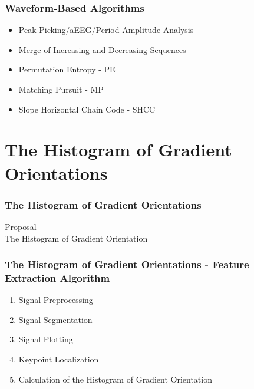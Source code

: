 \documentclass[aspectratio=169]{beamer}
\newcommand\Fontre{\fontsize{16}{16.2}\selectfont}
\begin{document}
\begin{frame}
\frametitle{Waveform-Based Algorithms}
\begin{center}
\begin{itemize}
 \item<1-> \Fontre Peak Picking/aEEG/Period Amplitude Analysis
 \item<1-> \Fontre Merge of Increasing and Decreasing Sequences
 \item<2-> \Fontre Permutation Entropy - PE
 \item<3-> \Fontre Matching Pursuit - MP
 \item<4-> \Fontre Slope Horizontal Chain Code - SHCC
\end{itemize}
\end{center}
\end{frame}


\section{The Histogram of Gradient Orientations}    
\begin{frame}
\frametitle{The Histogram of Gradient Orientations}
\begin{center}
\LARGE Proposal \\ The Histogram of Gradient Orientation
\end{center}
\end{frame}


\begin{frame}
\frametitle{The Histogram of Gradient Orientations - Feature Extraction Algorithm}
\begin{center}
\begin{enumerate}
 \item<1-> \Fontre Signal Preprocessing
 \item<2-> \Fontre Signal Segmentation
 \item<3-> \Fontre Signal Plotting
 \item<4-> \Fontre Keypoint Localization
 \item<5-> \Fontre Calculation of the Histogram of Gradient Orientation
\end{enumerate}
\end{center}
\end{frame}
\end{document}
